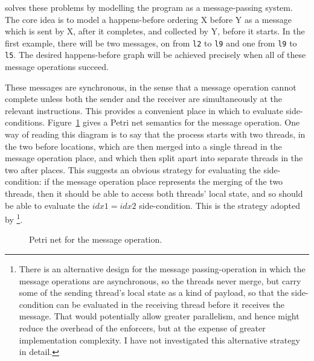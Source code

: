 {\Technique} solves these problems by modelling the program as a
message-passing system.  The core idea is to model a happens-before
ordering X before Y as a message which is sent by X, after it
completes, and collected by Y, before it starts.  In the first
example, there will be two messages, on from \texttt{l2} to
\texttt{l9} and one from \texttt{l9} to \texttt{l5}.  The desired
happens-before graph will be achieved precisely when all of these
message operations succeed.

These messages are synchronous, in the sense that a message operation
cannot complete unless both the sender and the receiver are
simultaneously at the relevant instructions.  This provides a
convenient place in which to evaluate side-conditions.
Figure~\ref{fig:message_petri_net} gives a Petri net semantics for the
message operation.  One way of reading this diagram is to say that the
process starts with two threads, in the two before locations, which
are then merged into a single thread in the message operation place,
and which then split apart into separate threads in the two after
places.  This suggests an obvious strategy for evaluating the
side-condition: if the message operation place represents the merging
of the two threads, then it should be able to access both threads'
local state, and so should be able to evaluate the $\mathit{idx1} = \mathit{idx2}$
side-condition.  This is the strategy adopted by
{\implementation}\footnote{There is an alternative design for the
  message passing-operation in which the message operations are
  asynchronous, so the threads never merge, but carry some of the
  sending thread's local state as a kind of payload, so that the
  side-condition can be evaluated in the receiving thread before it
  receives the message.  That would potentially allow greater
  parallelism, and hence might reduce the overhead of the enforcers,
  but at the expense of greater implementation complexity.  I have not
  investigated this alternative strategy in detail.}.

\begin{figure}
  \caption{Petri net for the message operation.}
  \label{fig:message_petri_net}
\end{figure}

